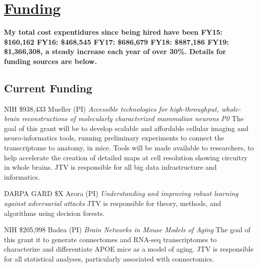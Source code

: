\documentclass[10pt,colorlinks=true,urlcolor=blue]{moderncv}
\begin{document}
\begin{refsection}
\nocite{*}
\printbibliography[%
    title=\href{https://neurodata.io/posters/}{Abstracts \& Posters},%
    heading=bibliography,%
    ]
\end{refsection}




\section{\href{https://neurodata.io/about/funding/}{Funding}}

\textbf{My total cost expentidures since being hired have been
FY15:	\$160,162
FY16:	\$468,545
FY17:	\$686,679
FY18:	\$887,186
FY19:	\$1,366,308, a steady increase each year of over 30\%. Details for funding sources are below.
}


\subsection{Current Funding}


    {NIH}%
    {\$938,433}
    {Mueller (PI)}
    {\emph{Accessible technologies for high-throughput, whole-brain reconstructions of molecularly characterized mammalian neurons  P0} 
    The  goal of this grant will be to develop scalable
    and affordable cellular imaging and neuro-informatics tools,
    running preliminary experiments to connect the transcriptome to
    anatomy, in mice. Tools will be made available to researchers,
    to help accelerate the creation of detailed maps at cell
    resolution showing circuitry in whole brains.}
    {JTV is responsible for all big data infrastructure and informatics.}
    {}
    
    {DARPA GARD}%
    {\$X}
    {Arora (PI)}
    {\emph{Understanding and improving robust learning against adversarial attacks}}
    {JTV is responsible for theory, methods, and algorithms using decision forests.}
    {}

    {NIH}%
    {\$205,998}
    {Badea (PI)}
    {\emph{Brain Networks in Mouse Models of Aging} 
    The  goal of this grant it to generate connectomes and RNA-seq transcriptomes to characterize and differentiate APOE mice as a model of aging.}
    {JTV is responsible for all statistical analyses, particularly associated with connectomics.}
    {}
\end{document}
